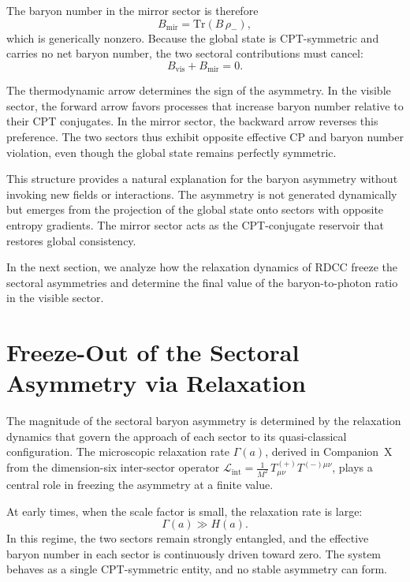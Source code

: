 \documentclass[11pt,a4paper]{article}
\newcommand{\rminus}{\rho_{-}}
\newcommand{\LintDef}{\mathcal{L}_{\mathrm{int}} = \frac{1}{M^{2}}\, T^{(+)}_{\mu\nu} T^{(-)\mu\nu}}
\newcommand{\Ha}{H(a)}
\newcommand{\GammaR}{\Gamma}
\newcommand{\Trm}{\mathrm{Tr}}
\begin{document}
The baryon number in the mirror sector is therefore
\begin{equation}
B_{\mathrm{mir}} = \Trm\!\left(B\,\rminus\right),
\end{equation}
which is generically nonzero. Because the global state is CPT-symmetric and
carries no net baryon number, the two sectoral contributions must cancel:
\begin{equation}
B_{\mathrm{vis}} + B_{\mathrm{mir}} = 0.
\end{equation}

The thermodynamic arrow determines the sign of the asymmetry. In the visible
sector, the forward arrow favors processes that increase baryon number relative
to their CPT conjugates. In the mirror sector, the backward arrow reverses this
preference. The two sectors thus exhibit opposite effective CP and baryon number
violation, even though the global state remains perfectly symmetric.

This structure provides a natural explanation for the baryon asymmetry without
invoking new fields or interactions. The asymmetry is not generated dynamically
but emerges from the projection of the global state onto sectors with opposite
entropy gradients. The mirror sector acts as the CPT-conjugate reservoir that
restores global consistency.

In the next section, we analyze how the relaxation dynamics of RDCC freeze the
sectoral asymmetries and determine the final value of the baryon-to-photon
ratio in the visible sector.


\section{Freeze-Out of the Sectoral Asymmetry via Relaxation}

The magnitude of the sectoral baryon asymmetry is determined by the relaxation
dynamics that govern the approach of each sector to its quasi-classical
configuration. The microscopic relaxation rate $\GammaR(a)$, derived in
Companion~X from the dimension-six inter-sector operator $\LintDef$, plays a
central role in freezing the asymmetry at a finite value.

At early times, when the scale factor is small, the relaxation rate is large:
\begin{equation}
\GammaR(a) \gg \Ha.
\end{equation}
In this regime, the two sectors remain strongly entangled, and the effective
baryon number in each sector is continuously driven toward zero. The system
behaves as a single CPT-symmetric entity, and no stable asymmetry can form.
\end{document}

